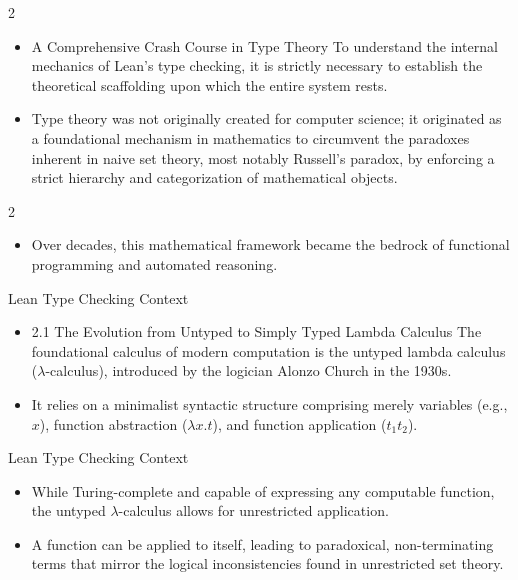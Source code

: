 \documentclass[10pt]{beamer}
\begin{document}
\begin{frame}{2}
\begin{itemize}\setlength{\itemsep}{1.5em}
  \item A Comprehensive Crash Course in Type Theory To understand the internal mechanics of Lean’s type checking, it is strictly necessary to establish the theoretical scaffolding upon which the entire system rests.
  \item Type theory was not originally created for computer science; it originated as a foundational mechanism in mathematics to circumvent the paradoxes inherent in naive set theory, most notably Russell's paradox, by enforcing a strict hierarchy and categorization of mathematical objects.
\end{itemize}
\end{frame}

\begin{frame}{2}
\begin{itemize}\setlength{\itemsep}{1.5em}
  \item Over decades, this mathematical framework became the bedrock of functional programming and automated reasoning.
\end{itemize}
\end{frame}

\begin{frame}{Lean Type Checking Context}
\begin{itemize}\setlength{\itemsep}{1.5em}
  \item 2.1 The Evolution from Untyped to Simply Typed Lambda Calculus The foundational calculus of modern computation is the untyped lambda calculus ($\lambda$-calculus), introduced by the logician Alonzo Church in the 1930s.
  \item It relies on a minimalist syntactic structure comprising merely variables (e.g., $x$), function abstraction ($\lambda x. t$), and function application ($t_1 t_2$).
\end{itemize}
\end{frame}

\begin{frame}{Lean Type Checking Context}
\begin{itemize}\setlength{\itemsep}{1.5em}
  \item While Turing-complete and capable of expressing any computable function, the untyped $\lambda$-calculus allows for unrestricted application.
  \item A function can be applied to itself, leading to paradoxical, non-terminating terms that mirror the logical inconsistencies found in unrestricted set theory.
\end{itemize}
\end{frame}
\end{document}
